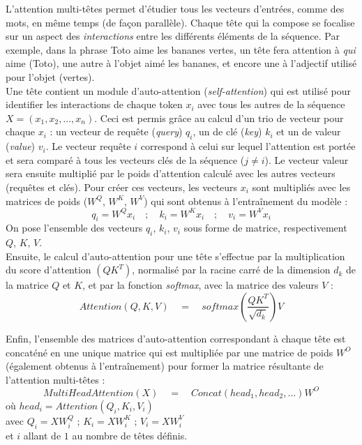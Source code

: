 \documentclass[12pt, twoside]{report}
\begin{document}
L'attention multi-têtes permet d'étudier tous les vecteurs d'entrées, comme des mots, en même temps (de façon parallèle). Chaque tête qui la compose se focalise sur un aspect des \textit{interactions} entre les différents éléments de la séquence. Par exemple, dans la phrase \og Toto aime les bananes vertes\fg{}, un tête fera attention à \textit{qui} aime (\og Toto\fg{}), une autre à l'objet aimé \og les bananes\fg{}, et encore une à l'adjectif utilisé pour l'objet (\og vertes\fg{}).\\ 

Une tête contient un module d'auto-attention (\textit{self-attention}) qui est utilisé pour identifier les interactions de chaque \gls{token} $x_i$ avec tous les autres de la séquence $X=(x_1, x_2, \dots, x_n)$. Ceci est permis grâce au calcul d'un trio de vecteur pour chaque $x_i$ : un vecteur de requête (\textit{query}) $q_i$, un de clé (\textit{key}) $k_i$ et un de valeur (\textit{value}) $v_i$. Le vecteur requête $i$ correspond à celui sur lequel l'attention est portée et sera comparé à tous les vecteurs clés de la séquence ($j\ne i$). Le vecteur valeur sera ensuite multiplié par le poids d'attention calculé avec les autres vecteurs (requêtes et clés). Pour créer ces vecteurs, les vecteurs $x_i$ sont multipliés avec les matrices de poids ($W^Q$, $W^K$, $W^V$) qui sont obtenus à l'entraînement du modèle :
\begin{equation}
    q_i = W^Q x_i \quad ; \quad k_i = W^K x_i \quad ; \quad v_i = W^V x_i
\end{equation}
On pose l'ensemble des vecteurs $q_i$, $k_i$, $v_i$ sous forme de matrice, respectivement $Q$, $K$, $V$.\\

Ensuite, le calcul d'auto-attention pour une tête s'effectue par la multiplication du score d'attention $(QK^T)$, normalisé par la racine carré de la dimension $d_k$ de la matrice $Q$ et $K$, et par la fonction \textit{softmax}, avec la matrice des valeurs $V$ :
\begin{equation}
    Attention(Q, K, V) \quad  = \quad  softmax(\frac{QK^T}{\sqrt{d_k}})V
\end{equation}

Enfin, l'ensemble des matrices d'auto-attention correspondant à chaque tête est concaténé en une unique matrice qui est multipliée par une matrice de poids $W^O$ (également obtenus à l'entraînement) pour former la matrice résultante de l'attention multi-têtes :
\begin{equation}
    MultiHeadAttention(X) \quad = \quad Concat(head_1, head_2, ...)W^O
\end{equation}
\hfill où $head_i = Attention(Q_i, K_i, V_i)$\\
\vspace{2pt}
\hfill avec $Q_i = XW^Q_i$ ; $K_i = XW^K_i$ ; $V_i = XW^V_i$\\
\vspace{2pt}
\hfill et $i$ allant de $1$ au nombre de têtes définis.\\
\end{document}
